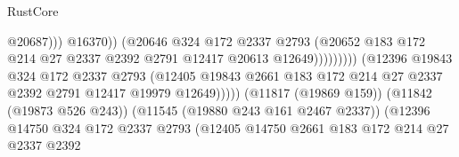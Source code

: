 \begin{lexlean}{RustCore}
\begin{coremodule}
                                                          @20687)))
                                                    @16370))
                                                (@20646
                                                  @324
                                                  @172
                                                  @2337
                                                  @2793
                                                  (@20652
                                                    @183
                                                    @172
                                                    @214
                                                    @27
                                                    @2337
                                                    @2392
                                                    @2791
                                                    @12417
                                                    @20613
                                                    @12649)))))))))
                                  (@12396
                                    @19843
                                    @324
                                    @172
                                    @2337
                                    @2793
                                    (@12405
                                      @19843
                                      @2661
                                      @183
                                      @172
                                      @214
                                      @27
                                      @2337
                                      @2392
                                      @2791
                                      @12417
                                      @19979
                                      @12649)))))
                            (@11817 (@19869 @159))
                            (@11842 (@19873 @526 @243))
                            (@11545 (@19880 @243 @161 @2467 @2337))
                            (@12396
                              @14750
                              @324
                              @172
                              @2337
                              @2793
                              (@12405
                                @14750
                                @2661
                                @183
                                @172
                                @214
                                @27
                                @2337
                                @2392

\end{coremodule}
\end{lexlean}
